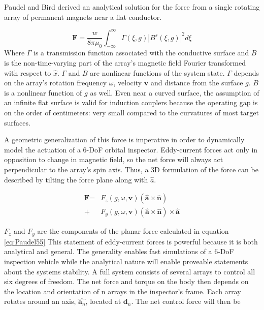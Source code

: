 \documentclass[letterpaper, 10 pt, conference]{ieeeconf}  %
\begin{document}
Paudel and Bird derived an analytical solution for the force from a single rotating array of permanent magnets near a flat conductor. \cite{Paudel2013}

\begin{equation}
\label{eq:Paudel55}
\textbf{F} = \frac{w}{8\pi\mu_0} \int^{\infty}_{-\infty}\Gamma(\xi,g)|B^s(\xi,g)|^2 d\xi
\end{equation}
Where $\Gamma$ is a transmission function associated with the conductive surface and $B$ is the non-time-varying part of the array's magnetic field Fourier transformed with respect to $\hat{x}$.
% 
 $\Gamma$ and $B$ are nonlinear functions of the system state. $\Gamma$ depends on the array's rotation frequency $\omega$, velocity $\textbf{v}$ and distance from the surface $g$. $B$ is a nonlinear function of $g$ as well. Even near a curved surface, the assumption of an infinite flat surface is valid for induction couplers because the operating gap is on the order of centimeters: very small compared to the curvatures of most target surfaces. 
 
A geometric generalization of this force is imperative in order to dynamically model the actuation of a 6-DoF orbital inspector. Eddy-current forces act only in opposition to change in magnetic field, so the net force will always act perpendicular to the array's spin axis. Thus, a 3D formulation of the force can be described by tilting the force plane along with $\hat{a}$. 



\begin{equation}
\label{eq:arrayForce}
\begin{split}
\textbf{F} =  &F_z(g,\omega,\textbf{v}) \left(\hat{\textbf{a}} \times \hat{\textbf{n}} \right) \\
			 + &F_y(g,\omega,\textbf{v}) \left(\hat{\textbf{a}} \times \hat{\textbf{n}} \right) \times \hat{\textbf{a}}
 \end{split}
 \end{equation}
 
 $F_z$ and $F_y$ are the components of the planar force calculated in equation \ref{eq:Paudel55}
 This statement of eddy-current forces is powerful because it is both analytical and general. The generality enables fast simulations of a 6-DoF inspection vehicle while the analytical nature will enable proveable statements about the systems stability.
A full system consists of several arrays to control all six degrees of freedom. The net force and torque on the body then depends on the location and orientation of n arrays in the inspector's frame. Each array rotates around an axis, $\hat{\textbf{a}_n}$, located at $\textbf{d}_n$. The net control force will then be 
 
\end{document}
